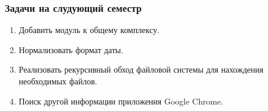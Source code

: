 \subsubsection{Задачи на слудующий семестр}
\begin{enumerate}
  \item Добавить модуль к общему комплексу.
  \item Нормализовать формат даты.
  \item Реализовать рекурсивный обход файловой системы для нахождения необходимых файлов.
  \item Поиск другой информации приложения Google Chrome.
\end{enumerate}

\clearpage
